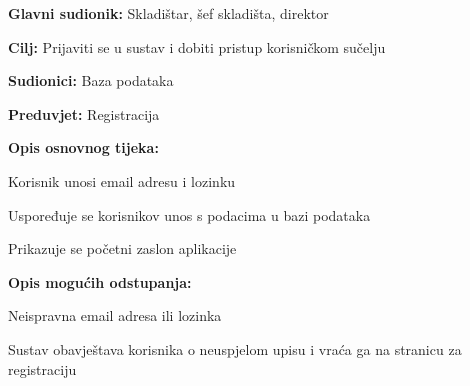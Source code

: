 					\noindent {}
					\begin{packed_item}
	
						\item \textbf{Glavni sudionik: }Skladištar, šef skladišta, direktor
						\item  \textbf{Cilj:} Prijaviti se u sustav i dobiti pristup korisničkom sučelju
						\item  \textbf{Sudionici:} Baza podataka
						\item  \textbf{Preduvjet:} Registracija
						\item  \textbf{Opis osnovnog tijeka:}
						
						\item[] \begin{packed_enum}
	
							\item Korisnik unosi email adresu i lozinku
							\item Uspoređuje se korisnikov unos s podacima u bazi podataka 
							\item Prikazuje se početni zaslon aplikacije
							
						\end{packed_enum}
						
						\item  \textbf{Opis mogućih odstupanja:}
						
						\item[] \begin{packed_item}
	
							\item[2.a] Neispravna email adresa  ili lozinka
							\item[] \begin{packed_enum}
								
								\item Sustav obavještava korisnika o neuspjelom upisu i vraća ga na stranicu za registraciju\\
								
							\end{packed_enum}
						\end{packed_item}
					\end{packed_item}
				
